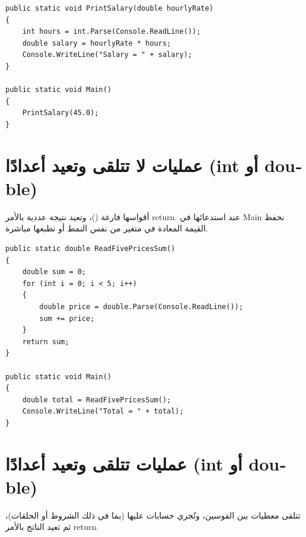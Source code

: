 \documentclass[14pt]{extarticle}
\begin{document}
\begin{boxExample}
\begin{english}
\begin{verbatim}
public static void PrintSalary(double hourlyRate)
{
    int hours = int.Parse(Console.ReadLine());
    double salary = hourlyRate * hours;
    Console.WriteLine("Salary = " + salary);
}

public static void Main()
{
    PrintSalary(45.0);
}
\end{verbatim}
\end{english}
\end{boxExample}

\filbreak
\section{عمليات لا تتلقى وتعيد أعدادًا (\textenglish{int} أو \textenglish{double})}
أقواسها فارغة \textenglish{()}، وتعيد نتيجة عددية بالأمر \textenglish{return}. عند استدعائها في \textenglish{Main} نحفظ القيمة المعادة في متغير من نفس النمط أو نطبعها مباشرة.

\begin{boxExample}
\begin{english}
\begin{verbatim}
public static double ReadFivePricesSum()
{
    double sum = 0;
    for (int i = 0; i < 5; i++)
    {
        double price = double.Parse(Console.ReadLine());
        sum += price;
    }
    return sum;
}

public static void Main()
{
    double total = ReadFivePricesSum();
    Console.WriteLine("Total = " + total);
}
\end{verbatim}
\end{english}
\end{boxExample}

\filbreak
\section{عمليات تتلقى وتعيد أعدادًا (\textenglish{int} أو \textenglish{double})}
تتلقى معطيات بين القوسين، وتُجري حسابات عليها (بما في ذلك الشروط أو الحلقات)، ثم تعيد الناتج بالأمر \textenglish{return}.
\end{document}
